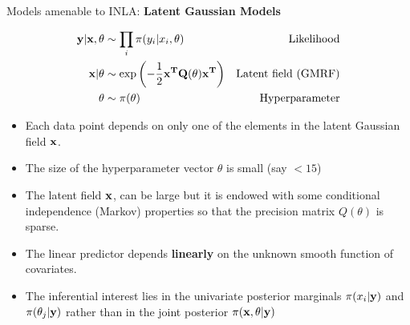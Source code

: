\documentclass[
  ignorenonframetext,
]{beamer}
\providecommand{\tightlist}{%
  \setlength{\itemsep}{0pt}\setlength{\parskip}{0pt}}
\begin{document}
\begin{frame}{Models amenable to INLA: \textbf{Latent Gaussian Models}}
\protect\hypertarget{models-amenable-to-inla-latent-gaussian-models}{}
\small

\[
\begin{aligned}
\bf{y}|\bf{x},\bf{\theta} & \sim \prod_i\pi(y_i|x_i,\theta) & \text{Likelihood}\\
\bf{x}|\bf{\theta} & \sim \exp \left(-\frac{1}{2}\bf{x}^T\bf{Q}(\theta)\bf{x}^T \right)& \text{Latent field (GMRF)}\\
\bf{\theta} & \sim \pi(\theta) & \text{Hyperparameter}
\end{aligned}
\]

\begin{itemize}[<+->]
\tightlist
\item
  Each data point depends on only one of the elements in the latent
  Gaussian field \(\bf{x}\).
\end{itemize}

\begin{itemize}[<+->]
\tightlist
\item
  The size of the hyperparameter vector \(\theta\) is small (say
  \(<15\))
\end{itemize}

\begin{itemize}[<+->]
\tightlist
\item
  The latent field \(\bf{x}\), can be large but it is endowed with some
  conditional independence (Markov) properties so that the precision
  matrix \(Q(\theta)\) is sparse.
\end{itemize}

\begin{itemize}[<+->]
\tightlist
\item
  The linear predictor depends \textbf{linearly} on the unknown smooth
  function of covariates.
\end{itemize}

\begin{itemize}[<+->]
\tightlist
\item
  The inferential interest lies in the univariate posterior marginals
  \(\pi(x_i|\bf{y})\) and \(\pi(\theta_j|\bf{y})\) rather than in the
  joint posterior \(\pi(\bf{x}, \theta|\bf{y})\)
\end{itemize}

\normalsize
\end{frame}
\end{document}
